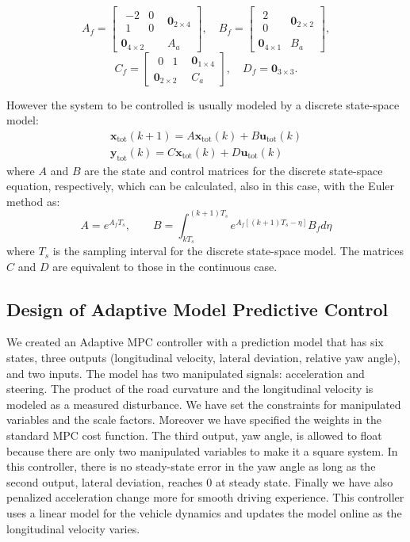 \documentclass[conference, 11pt]{IEEEtran}
\begin{document}
\[ 
A_f=\begin{bmatrix}
\begin{matrix}-2&0\\1&0\end{matrix}&\textbf{0}_{2\times4}\\
\textbf{0}_{4\times2}&A_a
\end{bmatrix},
\quad
B_f=\begin{bmatrix}\begin{matrix}2\\0\end{matrix}&\textbf{0}_{2\times2}\\
\textbf{0}_{4\times1}&B_a
\end{bmatrix},
\]
\[
C_f=\begin{bmatrix}
\begin{matrix}0&1\end{matrix}&\textbf{0}_{1\times4}\\
\textbf{0}_{2\times2}&C_a
\end{bmatrix}, 
\quad
D_f=\textbf{0}_{3\times3}. 
\]

However the system to be controlled is usually modeled by a discrete state-space model:
\begin{equation}
\label{eqn:full_dynamics_model_disc}
\begin{array}{rr}
{\textbf{x}}_{\text{tot}}(k+1) =A \textbf{x}_{\text{tot}}(k)+ B \textbf{u}_{\text{tot}}(k)\\
\textbf{y}_{\text{tot}}(k) =C\textbf{x}_{\text{tot}}(k) + D \textbf{u}_{\text{tot}}(k)
\end{array}
\end{equation}
where $A$ and $B$ are the state and control matrices for the discrete state-space equation, respectively, which can be calculated, also in this case, with the Euler method as:
\[
A = e^{A_fT_s},\qquad B = \int_{kT_s}^{(k+1)T_s} e^{A_f[(k+1)T_s-\eta]}B_f d\eta
\]
where $T_s$ is the sampling interval for the discrete state-space model. The matrices $C$ and $D$ are equivalent to those in the continuous case.

\subsection{Design of Adaptive Model Predictive Control}
We created an Adaptive MPC controller with a prediction model that has six states, three outputs (longitudinal velocity, lateral deviation, relative yaw angle), and two inputs. The model has two manipulated signals: acceleration and steering. The product of the road curvature and the longitudinal velocity is modeled as a measured disturbance. We have set the constraints for manipulated variables and the scale factors. Moreover we have specified the weights in the standard MPC cost function. The third output, yaw angle, is allowed to float because there are only two manipulated variables to make it a square system. In this controller, there is no steady-state error in the yaw angle as long as the second output, lateral deviation, reaches 0 at steady state. Finally we have also penalized acceleration change more for smooth driving experience. This controller uses a linear model for the vehicle dynamics and updates the model online as the longitudinal velocity varies.
\end{document}
